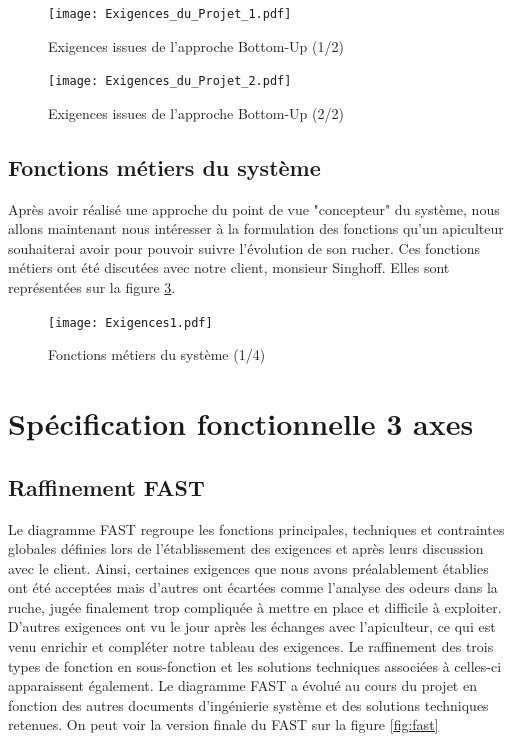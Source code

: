  
\begin{figure}[h!]
\centering\texttt{[image: Exigences\_du\_Projet\_1.pdf]}
\caption{\label{fig:exi1} Exigences issues de l'approche Bottom-Up (1/2)}
\end{figure}

 
\begin{figure}[h!]
\centering\texttt{[image: Exigences\_du\_Projet\_2.pdf]}
\caption{\label{fig:exi2} Exigences issues de l'approche Bottom-Up (2/2)}
\end{figure}

\clearpage

\section{Fonctions métiers du système}
\vspace{1.5cm}

Après avoir réalisé une approche du point de vue "concepteur" du système, nous allons maintenant nous intéresser à la formulation des fonctions qu'un apiculteur souhaiterai avoir pour pouvoir suivre l'évolution de son rucher. Ces fonctions métiers ont été discutées avec notre client, monsieur Singhoff. Elles sont représentées sur la figure \ref{fig:exi1}.


\begin{figure}[h!]
\centering\texttt{[image: Exigences1.pdf]}
\caption{\label{fig:exi1} Fonctions métiers du système (1/4)}
\end{figure}


\chapter{Spécification fonctionnelle 3 axes}

\section{Raffinement FAST}
\vspace{1.5cm}
Le diagramme FAST regroupe les fonctions principales, techniques et contraintes globales définies lors de l'établissement des exigences et après leurs discussion avec le client. Ainsi, certaines exigences que nous avons préalablement établies ont été acceptées mais d'autres ont écartées comme l'analyse des odeurs dans la ruche, jugée finalement trop compliquée à mettre en place et difficile à exploiter. D'autres exigences ont vu le jour après les échanges avec l'apiculteur, ce qui est venu enrichir et compléter notre tableau des exigences. Le raffinement des trois types de fonction en sous-fonction et les solutions techniques associées à celles-ci apparaissent également. Le diagramme FAST a évolué au cours du projet en fonction des autres documents d'ingénierie système et des solutions techniques retenues. 
On peut voir la version finale du FAST sur la figure \ref{fig:fast}

